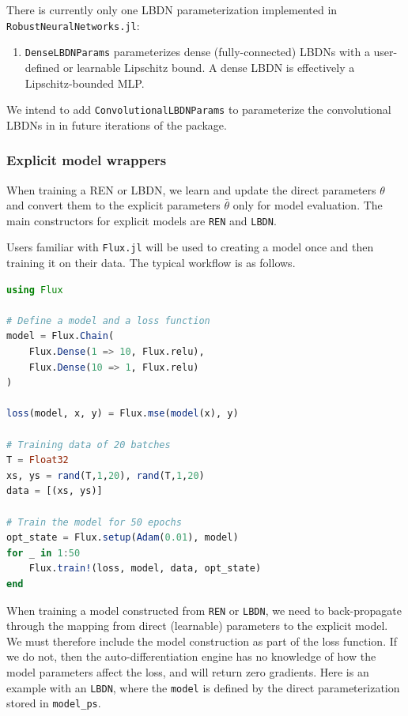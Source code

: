 There is currently only one LBDN parameterization implemented in \verb|RobustNeuralNetworks.jl|:

\begin{enumerate}
    \item \verb|DenseLBDNParams| parameterizes dense (fully-connected) LBDNs with a user-defined or learnable Lipschitz bound. A dense LBDN is effectively a Lipschitz-bounded MLP.
\end{enumerate}

We intend to add \verb|ConvolutionalLBDNParams| to parameterize the convolutional LBDNs in \cite{Wang+Manchester2023} in future iterations of the package.

\subsubsection{Explicit model wrappers} \label{sec:explicit-wrappers}

When training a REN or LBDN, we learn and update the direct parameters $\theta$ and convert them to the explicit parameters $\bar{\theta}$ only for model evaluation. The main constructors for explicit models are \verb|REN| and \verb|LBDN|.

Users familiar with \verb|Flux.jl| will be used to creating a model once and then training it on their data. The typical workflow is as follows.

\begin{lstlisting}[language = Julia]
using Flux

# Define a model and a loss function
model = Flux.Chain(
    Flux.Dense(1 => 10, Flux.relu), 
    Flux.Dense(10 => 1, Flux.relu)
)

loss(model, x, y) = Flux.mse(model(x), y)

# Training data of 20 batches
T = Float32
xs, ys = rand(T,1,20), rand(T,1,20)
data = [(xs, ys)]

# Train the model for 50 epochs
opt_state = Flux.setup(Adam(0.01), model)
for _ in 1:50
    Flux.train!(loss, model, data, opt_state)
end
\end{lstlisting}

When training a model constructed from \verb|REN| or \verb|LBDN|, we need to back-propagate through the mapping from direct (learnable) parameters to the explicit model. We must therefore include the model construction as part of the loss function. If we do not, then the auto-differentiation engine has no knowledge of how the model parameters affect the loss, and will return zero gradients. Here is an example with an \verb|LBDN|, where the \verb|model| is defined by the direct parameterization stored in \verb|model_ps|.

